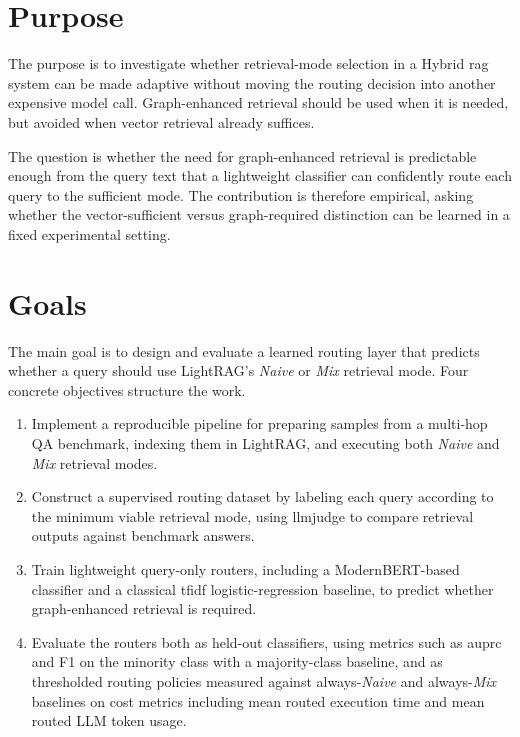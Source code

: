 \documentclass[english, bibtex]{kththesis}               %
\numberwithin{listing}{chapter}
\begin{document}
\section{Purpose}
\label{sec:purpose}
The purpose is to investigate whether retrieval-mode selection in a Hybrid \gls{rag} system can be made adaptive without moving the routing decision into another expensive model call. Graph-enhanced retrieval should be used when it is needed, but avoided when vector retrieval already suffices.

The question is whether the need for graph-enhanced retrieval is predictable enough from the query text that a lightweight classifier can confidently route each query to the sufficient mode. The contribution is therefore empirical, asking whether the vector-sufficient versus graph-required distinction can be learned in a fixed experimental setting.



\section{Goals}
\label{sec:goals}
The main goal is to design and evaluate a learned routing layer that predicts whether a query should use LightRAG's \emph{Naive} or \emph{Mix} retrieval mode. Four concrete objectives structure the work.

\begin{enumerate}
\item Implement a reproducible pipeline for preparing samples from a multi-hop QA benchmark, indexing them in LightRAG, and executing both \emph{Naive} and \emph{Mix} retrieval modes.
\item Construct a supervised routing dataset by labeling each query according to the minimum viable retrieval mode, using \gls{llmjudge} to compare retrieval outputs against benchmark answers.
\item Train lightweight query-only routers, including a ModernBERT-based classifier and a classical \gls{tfidf} logistic-regression baseline, to predict whether graph-enhanced retrieval is required.
\item Evaluate the routers both as held-out classifiers, using metrics such as \gls{auprc} and F1 on the minority class with a majority-class baseline, and as thresholded routing policies measured against always-\emph{Naive} and always-\emph{Mix} baselines on cost metrics including mean routed execution time and mean routed LLM token usage.
\end{enumerate}
\end{document}
